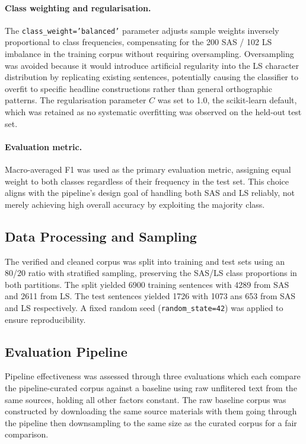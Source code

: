 \documentclass[11pt,a4paper]{article}
\begin{document}
\paragraph{Class weighting and regularisation.}
The \texttt{class\_weight='balanced'} parameter adjusts sample
weights inversely proportional to class frequencies, compensating
for the 200 SAS / 102 LS imbalance in the training corpus without
requiring oversampling. Oversampling was avoided because it would
introduce artificial regularity into the LS character distribution
by replicating existing sentences, potentially causing the
classifier to overfit to specific headline constructions rather
than general orthographic patterns. The regularisation parameter
$C$ was set to 1.0, the scikit-learn default, which was retained
as no systematic overfitting was observed on the held-out test
set.

\paragraph{Evaluation metric.}
Macro-averaged F1 was used as the primary evaluation metric,
assigning equal weight to both classes regardless of their
frequency in the test set. This choice aligns with the pipeline's
design goal of handling both SAS and LS reliably, not merely
achieving high overall accuracy by exploiting the majority class.


\subsection{Data Processing and Sampling }

The verified and cleaned corpus was split into training and test
sets using an 80/20 ratio with stratified sampling, preserving the
SAS/LS class proportions in both partitions. The split yielded 6900 training sentences with 4289 from SAS and 2611 from LS. The test sentences yielded 1726 with 1073 ans 653 from SAS and LS respectively.
A fixed random seed (\texttt{random\_state=42}) was applied to ensure reproducibility.

\subsection{Evaluation Pipeline}
\label{sec:eval}

Pipeline effectiveness was assessed through three evaluations which each compare the pipeline-curated corpus against a baseline using raw unflitered text from the same sources, holding all other factors constant. The raw baseline corpus was constructed by downloading the same source materials with them going through the pipeline then downsampling to the same size as the curated corpus for a fair comparison.
\end{document}
